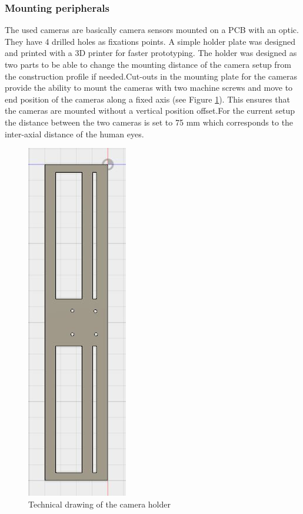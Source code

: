 \subsubsection{Mounting peripherals}
The used cameras are basically camera sensors mounted on a PCB with an optic. They have 4 drilled holes as fixations points. A simple holder plate was designed and printed with a 3D printer for faster prototyping. The holder was designed as two parts to be able to change the mounting distance of the camera setup from the construction profile if needed.Cut-outs in the mounting plate for the cameras provide the ability to mount the cameras with two machine screws and move to end position of the cameras along a fixed axis (see Figure \ref{img:camera_holder}). This ensures that the cameras are mounted without a vertical position offset.For the current setup the distance between the two cameras is set to 75 mm which corresponds to the inter-axial distance of the human eyes.
\begin{figure}[H]
\includegraphics[height=\textwidth, angle=90]{images/CAmera_holder_2.JPG}
\caption{Technical drawing of the camera holder}
\label{img:camera_holder} 
\end{figure}
